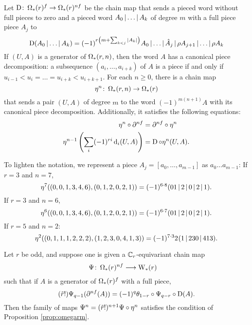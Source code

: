 Let $\operatorname{D} \colon \operatorname{\Omega}_{*}(r)^{f} \to \operatorname{\Omega}_{*}(r)^{nf}$ be the chain map that sends a pieced word without full pieces to zero and a pieced word $A_0\operatorname{|}\dots\operatorname{|} A_k$ of degree $m$ with a full piece piece $A_j$ to
\[
\operatorname{D}(A_0\operatorname{|} \dots\operatorname{|} A_k) = (-1)^{r\left(m+\sum_{k<j} |A_k|\right)} A_0\operatorname{|} \dots\operatorname{|} \hat{A}_{j}\operatorname{|} \rho A_{j+1}\operatorname{|} \dots\operatorname{|} \rho A_k
\]
If $(U,A)$ is a generator of $\operatorname{\Omega}_{*}(r,n)$, then the word $A$ has a canonical piece decomposition: a subsequence $(a_i,\dots,a_{i+k})$ of $A$ is a piece if and only if $u_{i-1}<u_i =\dots= u_{i+k}<u_{i+k+1}$. For each $n \geq 0$, there is a chain map
\begin{equation}\label{eq:eta}
    \eta^n \colon \operatorname{\Omega}_{*}(r,n) \to \operatorname{\Omega}_{*}(r)
\end{equation}
that sends a pair $(U,A)$ of degree $m$ to the word $(-1)^{m(n+1)}A$ with its canonical piece decomposition. Additionally, it satisfies the following equations:
\begin{align}\label{eq:lambda2}
\eta^n\circ \partial^{nf} &= \partial^{nf}\circ \eta^n
\\
\label{eq:lambda0}
	\eta^{n-1}\left(\sum_i (-1)^{ri}\operatorname{d}_i(U,A)\right) &= \operatorname{D}\circ \eta^n(U,A).
\end{align}
%
\begin{example}\label{example:omegar} To lighten the notation, we represent a piece $A_j = [a_0,\dots,a_{m-1}]$ as $a_0\dots a_{m-1}$: If $r=3$ and $n=7$,
	\[
		\eta^7((0,0,1,3,4,6),(0,1,2,0,2,1)) = (-1)^{6\cdot 8}(01\operatorname{|} 2\operatorname{|} 0\operatorname{|} 2\operatorname{|} 1).
	\]
	If $r=3$ and $n=6$,
	\[
		\eta^6((0,0,1,3,4,6),(0,1,2,0,2,1)) = (-1)^{6\cdot 7}(01\operatorname{|} 2\operatorname{|} 0\operatorname{|} 2\operatorname{|} 1).
	\]
	If $r=5$ and $n=2$:
	\[
		\eta^2((0,1,1,1,2,2,2),(1,2,3,0,4,1,3)) = (-1)^{7\cdot 3} 2^{}(1\operatorname{|} 230\operatorname{|} 413).
	\]
\end{example}

\begin{lemma}\label{lemma:omegar}
	Let $r$ be odd, and suppose one is given a $\mathbb{C}_r$-equivariant chain map
	\begin{align*}
		\Psi \colon \operatorname{\Omega}_{*}(r)^{nf}& \longrightarrow \operatorname{W}_{*}(r)
	\end{align*}
	such that if $A$ is a generator of $\operatorname{\Omega}_{*}(r)^{f}$ with a full piece,
	\begin{equation}\label{eq:lambda}
		(\tilde{r}!)\Psi_{q-1}(\partial^{nf} (A)) = (-1)^q\theta_{1-r}\circ\Psi_{q-r}\circ\operatorname{D}(A).
	\end{equation}
	Then the family of maps $\Psi^n = (\tilde{r}!)^{n+1}\Psi\circ \eta^n$ satisfies the condition of Proposition \ref{prop:omegarm}.
\end{lemma}

